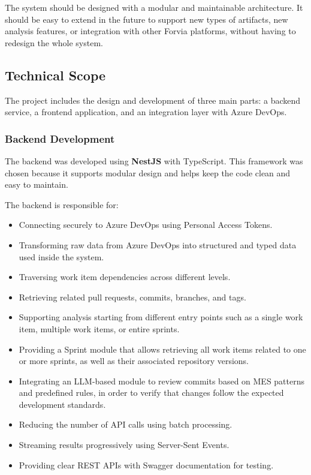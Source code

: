The system should be designed with a modular and maintainable architecture.
It should be easy to extend in the future to support new types of artifacts,
new analysis features, or integration with other Forvia platforms, without
having to redesign the whole system.
\subsection{Technical Scope}
\label{subsec:technical-scope}

The project includes the design and development of three main parts: a backend
service, a frontend application, and an integration layer with Azure DevOps.

\subsubsection{Backend Development}
The backend was developed using \textbf{NestJS} with TypeScript. This framework
was chosen because it supports modular design and helps keep the code clean and
easy to maintain.

The backend is responsible for:

\begin{itemize}
  \item Connecting securely to Azure DevOps using Personal Access Tokens.
  \item Transforming raw data from Azure DevOps into structured and typed data
  used inside the system.
  \item Traversing work item dependencies across different levels.
  \item Retrieving related pull requests, commits, branches, and tags.
  \item Supporting analysis starting from different entry points such as
  a single work item, multiple work items, or entire sprints.
  \item Providing a Sprint module that allows retrieving all work items
  related to one or more sprints, as well as their associated repository versions.
  \item Integrating an LLM-based module to review commits based on MES patterns
  and predefined rules, in order to verify that changes follow the expected
  development standards.
  \item Reducing the number of API calls using batch processing.
  \item Streaming results progressively using Server-Sent Events.
  \item Providing clear REST APIs with Swagger documentation for testing.
\end{itemize}

